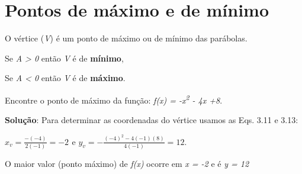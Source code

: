 \section{Pontos de máximo e de mínimo}

\begin{caixa}
O vértice (\textit{V}) é um ponto de máximo ou de mínimo das parábolas.

Se \textit{A >  0} então \textit{V} é de \textbf{mínimo}, 

Se \textit{A <  0} então \textit{V} é de \textbf{máximo}. 
\end{caixa}

\begin{texemplo}
Encontre o ponto de máximo da função:  \textit{f(x) = -x\textsuperscript{2} - 4x +8}. 

\textbf{Solução}: Para determinar as coordenadas do vértice usamos as Eqs. 3.11 e 3.13:

 \( x_{v}=\frac{- \left( -4 \right) }{2 \left( -1 \right) }=-2_{} \)      e        \( y_{v}=-\frac{ \left( -4 \right) ^{2}-4 \left( -1 \right)  \left( 8 \right) }{4 \left( -1 \right) }=12._{~ } \) 

O maior valor (ponto máximo) de  \textit{f(x) } ocorre em \textit{x = -2} e é \textit{y = 12} \qedsymbol{}
\end{texemplo}

